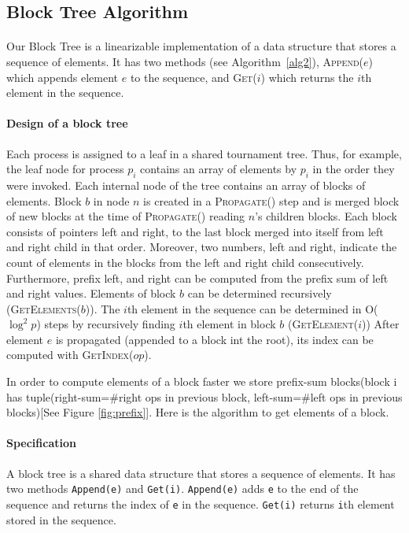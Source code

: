 \documentclass[10pt]{article}
\theoremstyle{definition}
\begin{document}
\pagebreak
\subsection{Block Tree Algorithm}
\paragraph{}
Our Block Tree is a linearizable implementation of a data structure that stores a sequence of elements. It has two methods (see Algorithm~\ref{alg2}), \textsc{Append}($e$) which appends element $e$ to the sequence, and \textsc{Get}($i$) which returns the $i$th element in the sequence.

\paragraph{Design of a block tree}

Each process is assigned to a leaf in a shared tournament tree. Thus, for example, the leaf node for process $p_i$ contains an array of elements by $p_i$ in the order they were invoked.
Each internal node of the tree contains an array of blocks of elements.
Block $b$ in node $n$ is created in a \textsc{Propagate}() step and is merged block of new blocks at the time of \textsc{Propagate}() reading $n$'s children blocks. Each block consists of pointers left and right, to the last block merged into itself from left and right child in that order. Moreover, two numbers, left and right, indicate the count of elements in the blocks from the left and right child consecutively. Furthermore, prefix left, and right can be computed from the prefix sum of left and right values.
Elements of block $b$ can be determined recursively (\textsc{GetElements($b$)}).
The $i$th element in the sequence can be determined in \textsc{O}($\log^2 p$) steps by recursively finding $i$th element in block $b$ (\textsc{GetElement($i$)})
After element $e$ is propagated (appended to a block int the root), its index can be computed with \textsc{GetIndex}($op$).


In order to compute elements of a block faster we store prefix-sum blocks(block i has tuple(right-sum=$\#$right ops in previous block, left-sum=$\#$left ops in previous blocks)[See Figure \ref{fig:prefix}]. Here is the algorithm to get elements of a block.

\paragraph{Specification}
A block tree is a shared data structure that stores a sequence of elements.  It has two methods \texttt{Append(e)} and \texttt{Get(i)}. \texttt{Append(e)} adds \texttt{e} to the end of the sequence and returns the index of \texttt{e} in the sequence. \texttt{Get(i)} returns \texttt{i}th element stored in the sequence. 
\end{document}
